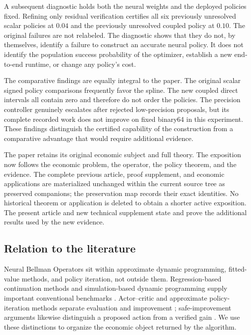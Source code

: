 \documentclass[ecta,nameyear,draft]{econsocart}
\begin{document}
A subsequent diagnostic holds both the neural weights and the deployed policies fixed. Refining only residual verification certifies all six previously unresolved scalar policies at $0.04$ and the previously unresolved coupled policy at $0.10$. The original failures are not relabeled. The diagnostic shows that they do not, by themselves, identify a failure to construct an accurate neural policy. It does not identify the population success probability of the optimizer, establish a new end-to-end runtime, or change any policy's cost.

The comparative findings are equally integral to the paper. The original scalar signed policy comparisons frequently favor the spline. The new coupled direct intervals all contain zero and therefore do not order the policies. The precision controller genuinely escalates after rejected low-precision proposals, but its complete recorded work does not improve on fixed binary64 in this experiment. These findings distinguish the certified capability of the construction from a comparative advantage that would require additional evidence.

The paper retains its original economic subject and full theory. The exposition now follows the economic problem, the operator, the policy theorem, and the evidence. The complete previous article, proof supplement, and economic applications are materialized unchanged within the current source tree as preserved companions; the preservation map records their exact identities. No historical theorem or application is deleted to obtain a shorter active exposition. The present article and new technical supplement state and prove the additional results used by the new evidence.

\subsection{Relation to the literature}
Neural Bellman Operators sit within approximate dynamic programming, fitted-value methods, and policy iteration, not outside them. Regression-based continuation methods and simulation-based dynamic programming supply important conventional benchmarks \citep{judd1998,powell2011,longstaff2001,ernst2005}. Actor--critic and approximate policy-iteration methods separate evaluation and improvement \citep{konda1999,scherrer2015}; safe-improvement arguments likewise distinguish a proposed action from a verified gain \citep{kakade2002,pirotta2013}. We use these distinctions to organize the economic object returned by the algorithm.
\end{document}
